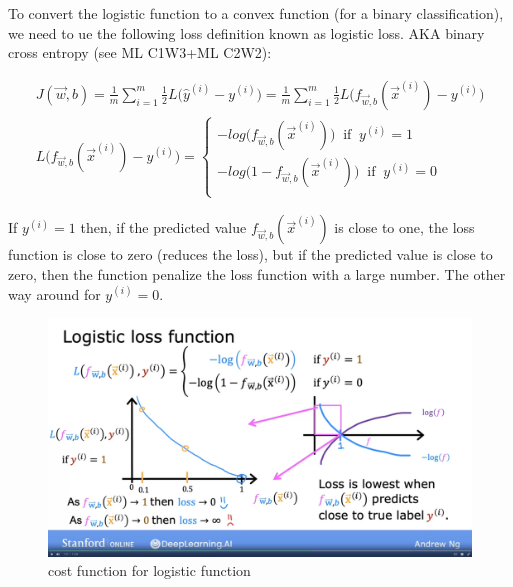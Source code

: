 \documentclass[12pt]{report}
\begin{document}
To convert the logistic function to a convex function (for a binary classification), we need to ue the following loss definition known as logistic loss. AKA binary cross entropy (see ML C1W3+ML C2W2):

\begin{multline}
J(\overrightarrow{w},b) = \frac{1}{m} \sum_{i=1}^{m} \frac{1}{2}  L\big(\hat{y}^{(i)}  - y^{(i)} \big) = \frac{1}{m} \sum_{i=1}^{m} \frac{1}{2}  L\big(f_{\overrightarrow{w},b} (\overrightarrow{x}^{(i)})   - y^{(i)} \big)\\
L\big(f_{\overrightarrow{w},b} (\overrightarrow{x}^{(i)})   - y^{(i)} \big) =
\begin{cases}
  -log\big( f_{\overrightarrow{w},b} (\overrightarrow{x}^{(i)}) \big)  \;\; \text{if} \;\; y^{(i)} = 1  \\
  -log\big(1-f_{\overrightarrow{w},b} (\overrightarrow{x}^{(i)}) \big)  \;\; \text{if} \;\; y^{(i)} = 0  \\
\end{cases}
\end{multline}

If $y^{(i)} = 1$ then, if the predicted value $f_{\overrightarrow{w},b} (\overrightarrow{x}^{(i)}) $ is close to one, the loss function is close to zero (reduces the loss), but if the predicted value is close to zero, then the function penalize the loss function with a large number. The other way around for $y^{(i)} = 0$.

\begin{figure}[htbp]
  \begin{center}
    \includegraphics[trim =0cm 6.0cm 0cm 0.0cm, clip, scale=0.15]{pics/logistic2.png}
    \caption{cost function for logistic function}
  \end{center}
\end{figure}
\end{document}
